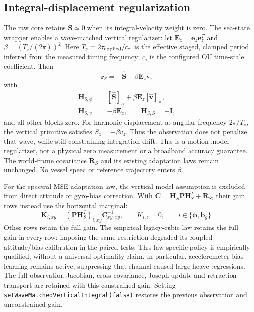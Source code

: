 \documentclass[conference]{IEEEtran}
\newcommand{\Skew}[1]{\left[#1\right]_\times}
\theoremstyle{bodysmall}
\begin{document}
\subsection{Integral-displacement regularization}
The raw core retains $\bm{S}\simeq0$ when its integral-velocity weight is
zero. The sea-state wrapper enables a wave-matched vertical regularizer:
let $\bm{E}_z=\bm{e}_z\bm{e}_z^T$ and
$\beta=(T_z/(2\pi))^2$. Here $T_z=2\tau_{\rm applied}/c_\tau$ is the
effective staged, clamped period inferred from the measured tuning frequency;
$c_\tau$ is the configured OU time-scale coefficient. Then
\begin{equation}
\bm{r}_S=-\hat {\bm{S}}-\beta\bm{E}_z\hat {\bm{v}},
\end{equation}
with
\begin{equation}
\begin{aligned}
\bm{H}_{S,\phi}&=\Skew{\hat {\bm{S}}}+\beta\bm{E}_z\Skew{\hat {\bm{v}}},\\
\bm{H}_{S,v}&=-\beta\bm{E}_z,\qquad \bm{H}_{S,S}=-\bm{I},
\end{aligned}
\end{equation}
and all other blocks zero.
For harmonic displacement at angular frequency $2\pi/T_z$, the vertical
primitive satisfies $S_z=-\beta v_z$. Thus the observation does not penalize
that wave, while still constraining integration drift. This is a motion-model
regularizer, not a physical zero measurement or a broadband accuracy guarantee.
The world-frame covariance $\bm{R}_S$ and its existing adaptation laws remain
unchanged. No vessel speed or reference trajectory enters $\beta$.

For the spectral-MSE adaptation law, the vertical model assumption is excluded
from direct attitude or gyro-bias correction. With $\bm{C}=\bm{H}_S\bm{P}\bm{H}_S^T+\bm{R}_S$, their gain
rows instead use the horizontal marginal:
\begin{equation}
\bm{K}_{i,xy}=(\bm{P}\bm{H}_S^T)_{i,xy}\bm{C}_{xy,xy}^{-1},
\qquad K_{i,z}=0,\qquad i\in\{\bm{\phi},\bm{b}_g\}.
\end{equation}
Other rows retain the full gain. The empirical legacy-cubic law retains the
full gain in every row: imposing the same restriction degraded its coupled
attitude/bias calibration in the paired tests. This law-specific policy is
empirically qualified, without a universal optimality claim. In particular,
accelerometer-bias learning
remains active; suppressing that channel caused large heave regressions.
The full observation Jacobian, cross covariance, Joseph update and retraction
transport are retained with this constrained gain. Setting
\texttt{setWaveMatchedVerticalIntegral(false)} restores the previous observation
and unconstrained gain.
\end{document}
